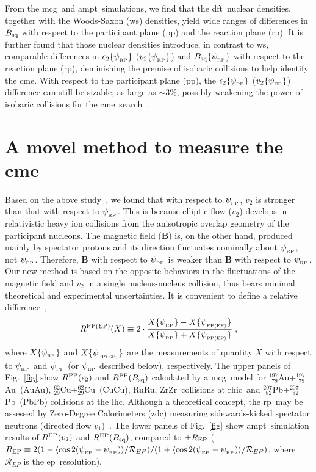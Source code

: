 \documentclass[3p,times,procedia]{elsarticle}
\newcommand {\rhic}	{{\sc rhic}}
\newcommand {\lhc}	{{\sc lhc}}
\newcommand {\dft}	{{\sc dft}}
\newcommand {\ampt}	{{\sc ampt}}
\newcommand {\mcg}	{{\sc mcg}}
\newcommand {\ws}	{{\sc ws}}
\newcommand {\cme}	{{\mbox{\sc cme}}}
\newcommand {\RP}	{{\sc rp}}
\newcommand {\PP}	{{\sc pp}}
\newcommand {\EP}	{{\sc ep}}
\newcommand {\psiRP}	{\psi_{_{\rm RP}}}
\newcommand {\psiPP}	{\psi_{_{\rm PP}}}
\newcommand {\psiEP}	{\psi_{_{\rm EP}}}
\newcommand {\etwo}	{\epsilon_2}
\newcommand {\eRP}	{\etwo\{\psiRP\}}
\newcommand {\ePP}	{\etwo\{\psiPP\}}
\newcommand {\vv}	{v_2}
\newcommand {\vRP}	{\vv\{\psiRP\}}
\newcommand {\vEP}	{\vv\{\psiEP\}}
\newcommand {\Au}	{$^{197}_{\;\,79}$Au}
\newcommand {\Cu}	{$^{62}_{29}$Cu}
\newcommand {\Pb}	{$^{207}_{\;\,82}$Pb}
\newcommand {\CuCu}	{CuCu}
\newcommand {\PbPb}	{PbPb}
\newcommand {\RuRu}	{RuRu}
\newcommand {\ZrZr}	{ZrZr}
\newcommand {\AuAu}	{AuAu}
\newcommand {\zdc}	{{\sc zdc}}
\newcommand {\psiPPEP}	{\psi_{_{\rm PP(EP)}}}
\newcommand {\RPP}	{R^{\rm PP}}
\newcommand {\REP}	{R^{\rm EP}}
\newcommand {\rEP}	{R_{\rm EP}}
\newcommand {\RPPEP}	{R^{\rm PP(EP)}}
\newcommand {\Bbf}	{\mathbf{B}}
\newcommand {\Bsq}	{B_{\rm sq}}
\newcommand {\BRP}	{\Bsq\{\psiRP\}}
\newcommand {\mean}[1]	{\langle #1\rangle}
\begin{document}
From the \mcg\ and \ampt\ simulations, we find that the \dft\ nuclear densities, together with the Woods-Saxon (\ws) densities, yield wide ranges of differences in $\Bsq$ with respect to the participant plane (\PP) and the reaction plane (\RP). %
It is further found that those nuclear densities introduce, in contrast to \ws, comparable differences in $\eRP$ ($\vRP$) and $\BRP$ with respect to the reaction plane (\RP), deminishing the premise of isobaric collisions to help identify the \cme. With respect to the participant plane (\PP), the $\ePP$ ($\vEP$) difference can still be sizable, as large as $\sim3$\%, possibly weakening the power of isobaric collisions for the \cme\ search~\cite{Xu:2017zcn}. 
%

\section{A movel method to measure the \cme}
Based on the above study~\cite{Xu:2017zcn}, we found that with respect to $\psiPP$, $\vv$ is stronger than that with respect to $\psiRP$. This is because elliptic flow ($\vv$) develops in relativistic heavy ion collisions from the anisotropic overlap geometry of the participant nucleons.
The magnetic field ($\Bbf$) is, on the other hand, produced mainly by spectator protons and its direction fluctuates nominally about $\psiRP$, not $\psiPP$. Therefore, $\Bbf$ with respect to $\psiPP$ is weaker than $\Bbf$ with respect to $\psiRP$. 
Our new method is based on the opposite behaviors in the fluctuations of the magnetic field and $v_2$ in a single nucleus-nucleus collision, thus bears minimal theoretical and experimental uncertainties.
It is convenient to define a relative difference~\cite{Xu:2017qfs},
\begin{equation}
\RPPEP(X)\equiv2\cdot\frac{X\{\psiRP\}-X\{\psiPPEP\}}{X\{\psiRP\}+X\{\psiPPEP\}}\;,
\end{equation}
where $X\{\psiRP\}$ and $X\{\psiPPEP\}$ are the measurements of quantity $X$ with respect to $\psiRP$ and $\psiPP$ (or $\psiEP$ described below), respectively. 
The upper panels of Fig.~\ref{fig} show $\RPP(\etwo)$ and $\RPP(\Bsq)$ calculated by a \mcg\ model for \Au+\Au\ (\AuAu), \Cu+\Cu\ (\CuCu), \RuRu,
\ZrZr\ collisions at \rhic\ and \Pb+\Pb\ (\PbPb) collisions at the \lhc. 
Although a theoretical concept, the \RP\ may be assessed by Zero-Degree Calorimeters (\zdc) measuring sidewards-kicked spectator neutrons (directed flow $v_1$)~.
The lower panels of Fig.~\ref{fig} show \ampt\ simulation results of $\REP(\vv)$ and $\REP(\Bsq)$, compared to $\pm\rEP$ ($\rEP \equiv 2(1 - \mean{\cos2(\psiEP-\psiRP)}/\mathcal{R}_{EP})/(1 + \mean{\cos2(\psiEP-\psiRP)}/\mathcal{R}_{EP})$, where $\mathcal{R}_{EP}$ is the \EP\ resolution). 
\end{document}
